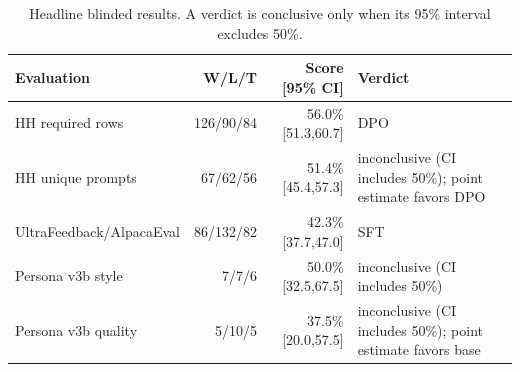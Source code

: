 \begin{table}[H]\centering\footnotesize\caption{Headline blinded results. A verdict is conclusive only when its 95\% interval excludes 50\%.}\label{tab:headline}
\begin{tabularx}{\textwidth}{Xrr>{\raggedright\arraybackslash}p{3.8cm}}\toprule Evaluation & W/L/T & Score [95\% CI] & Verdict\\\midrule
HH required rows & 126/90/84 & 56.0\% [51.3,60.7] & DPO\\
HH unique prompts & 67/62/56 & 51.4\% [45.4,57.3] & inconclusive (CI includes 50\%); point estimate favors DPO\\
UltraFeedback/AlpacaEval & 86/132/82 & 42.3\% [37.7,47.0] & SFT\\
Persona v3b style & 7/7/6 & 50.0\% [32.5,67.5] & inconclusive (CI includes 50\%)\\
Persona v3b quality & 5/10/5 & 37.5\% [20.0,57.5] & inconclusive (CI includes 50\%); point estimate favors base\\
\bottomrule\end{tabularx}\end{table}
